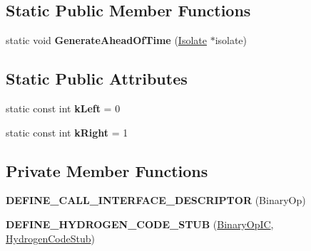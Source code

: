 \subsection*{Static Public Member Functions}
\begin{DoxyCompactItemize}
\item 
static void {\bfseries Generate\+Ahead\+Of\+Time} (\hyperlink{classv8_1_1internal_1_1_isolate}{Isolate} $\ast$isolate)\hypertarget{classv8_1_1internal_1_1_binary_op_i_c_stub_a827c2ea3029cb673819c7f633b357ac6}{}\label{classv8_1_1internal_1_1_binary_op_i_c_stub_a827c2ea3029cb673819c7f633b357ac6}

\end{DoxyCompactItemize}
\subsection*{Static Public Attributes}
\begin{DoxyCompactItemize}
\item 
static const int {\bfseries k\+Left} = 0\hypertarget{classv8_1_1internal_1_1_binary_op_i_c_stub_a4b6bc058ea73c9f688e388a9a381809a}{}\label{classv8_1_1internal_1_1_binary_op_i_c_stub_a4b6bc058ea73c9f688e388a9a381809a}

\item 
static const int {\bfseries k\+Right} = 1\hypertarget{classv8_1_1internal_1_1_binary_op_i_c_stub_a1eacdcdd63ace6ece659bba90fe9119c}{}\label{classv8_1_1internal_1_1_binary_op_i_c_stub_a1eacdcdd63ace6ece659bba90fe9119c}

\end{DoxyCompactItemize}
\subsection*{Private Member Functions}
\begin{DoxyCompactItemize}
\item 
{\bfseries D\+E\+F\+I\+N\+E\+\_\+\+C\+A\+L\+L\+\_\+\+I\+N\+T\+E\+R\+F\+A\+C\+E\+\_\+\+D\+E\+S\+C\+R\+I\+P\+T\+OR} (Binary\+Op)\hypertarget{classv8_1_1internal_1_1_binary_op_i_c_stub_a7e70c47e9d9a3cf479fdc7fa34458954}{}\label{classv8_1_1internal_1_1_binary_op_i_c_stub_a7e70c47e9d9a3cf479fdc7fa34458954}

\item 
{\bfseries D\+E\+F\+I\+N\+E\+\_\+\+H\+Y\+D\+R\+O\+G\+E\+N\+\_\+\+C\+O\+D\+E\+\_\+\+S\+T\+UB} (\hyperlink{classv8_1_1internal_1_1_binary_op_i_c}{Binary\+Op\+IC}, \hyperlink{classv8_1_1internal_1_1_hydrogen_code_stub}{Hydrogen\+Code\+Stub})\hypertarget{classv8_1_1internal_1_1_binary_op_i_c_stub_a70e4e57e9167e30e973c94f271989ad2}{}\label{classv8_1_1internal_1_1_binary_op_i_c_stub_a70e4e57e9167e30e973c94f271989ad2}

\end{DoxyCompactItemize}
